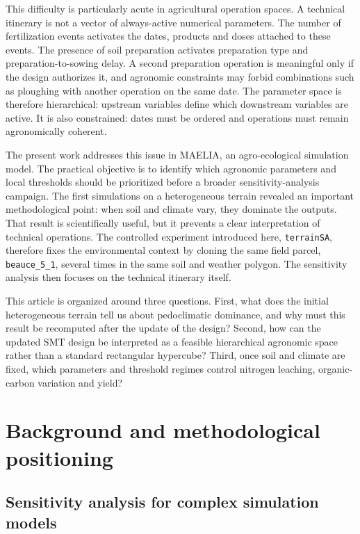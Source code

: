 \documentclass[11pt,a4paper]{article}
\begin{document}
This difficulty is particularly acute in agricultural operation spaces. A technical itinerary is not a vector of always-active numerical parameters. The number of fertilization events activates the dates, products and doses attached to these events. The presence of soil preparation activates preparation type and preparation-to-sowing delay. A second preparation operation is meaningful only if the design authorizes it, and agronomic constraints may forbid combinations such as ploughing with another operation on the same date. The parameter space is therefore hierarchical: upstream variables define which downstream variables are active. It is also constrained: dates must be ordered and operations must remain agronomically coherent.

The present work addresses this issue in MAELIA, an agro-ecological simulation model. The practical objective is to identify which agronomic parameters and local thresholds should be prioritized before a broader sensitivity-analysis campaign. The first simulations on a heterogeneous terrain revealed an important methodological point: when soil and climate vary, they dominate the outputs. That result is scientifically useful, but it prevents a clear interpretation of technical operations. The controlled experiment introduced here, \texttt{terrainSA}, therefore fixes the environmental context by cloning the same field parcel, \texttt{beauce\_5\_1}, several times in the same soil and weather polygon. The sensitivity analysis then focuses on the technical itinerary itself.

This article is organized around three questions. First, what does the initial heterogeneous terrain tell us about pedoclimatic dominance, and why must this result be recomputed after the update of the design? Second, how can the updated SMT design be interpreted as a feasible hierarchical agronomic space rather than a standard rectangular hypercube? Third, once soil and climate are fixed, which parameters and threshold regimes control nitrogen leaching, organic-carbon variation and yield?

\section{Background and methodological positioning}

\subsection{Sensitivity analysis for complex simulation models}
\end{document}
